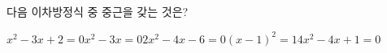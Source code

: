 다음 이차방정식 중 중근을 갖는 것은?
\begin{choicesii}{$x^2-3x+2=0$}{$x^2-3x=0$}{$2x^2-4x-6=0$}{$(x-1)^2=1$}{$4x^2-4x+1=0$}\end{choicesii}
